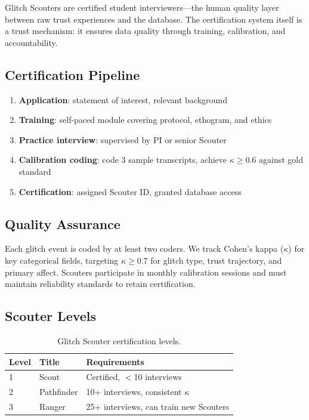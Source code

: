 \documentclass[11pt,a4paper]{article}
\begin{document}
Glitch Scouters are certified student interviewers---the human quality layer between raw trust experiences and the database. The certification system itself is a trust mechanism: it ensures data quality through training, calibration, and accountability.

\subsection{Certification Pipeline}

\begin{enumerate}[noitemsep]
    \item \textbf{Application}: statement of interest, relevant background
    \item \textbf{Training}: self-paced module covering protocol, ethogram, and ethics
    \item \textbf{Practice interview}: supervised by PI or senior Scouter
    \item \textbf{Calibration coding}: code 3 sample transcripts, achieve $\kappa \geq 0.6$ against gold standard
    \item \textbf{Certification}: assigned Scouter ID, granted database access
\end{enumerate}

\subsection{Quality Assurance}

Each glitch event is coded by at least two coders. We track Cohen's kappa ($\kappa$) for key categorical fields, targeting $\kappa \geq 0.7$ for glitch type, trust trajectory, and primary affect. Scouters participate in monthly calibration sessions and must maintain reliability standards to retain certification.

\subsection{Scouter Levels}

\begin{table}[h]
\centering
\begin{tabular}{@{}lll@{}}
\toprule
\textbf{Level} & \textbf{Title} & \textbf{Requirements} \\
\midrule
1 & Scout & Certified, $<$10 interviews \\
2 & Pathfinder & 10+ interviews, consistent $\kappa$ \\
3 & Ranger & 25+ interviews, can train new Scouters \\
\bottomrule
\end{tabular}
\caption{Glitch Scouter certification levels.}
\label{tab:scouters}
\end{table}
\end{document}
